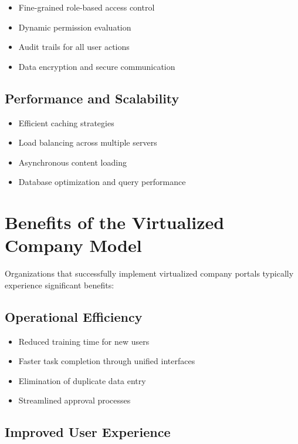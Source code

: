 \begin{itemize}
	\item Fine-grained role-based access control
	\item Dynamic permission evaluation
	\item Audit trails for all user actions
	\item Data encryption and secure communication
\end{itemize}

\subsection{Performance and Scalability}

\begin{itemize}
	\item Efficient caching strategies
	\item Load balancing across multiple servers
	\item Asynchronous content loading
	\item Database optimization and query performance
\end{itemize}

\section{Benefits of the Virtualized Company Model}
\label{sec:benefits}

Organizations that successfully implement virtualized company portals typically experience significant benefits:

\subsection{Operational Efficiency}

\begin{itemize}
	\item Reduced training time for new users
	\item Faster task completion through unified interfaces
	\item Elimination of duplicate data entry
	\item Streamlined approval processes
\end{itemize}

\subsection{Improved User Experience}

